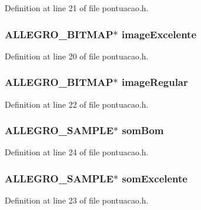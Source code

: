 Definition at line 21 of file pontuacao.\-h.

\hypertarget{struct_ranked_a35a1832af793bed669bf45cb25baa25c}{
\subsubsection[{image\-Excelente}]{\setlength{\rightskip}{0pt plus 5cm}A\-L\-L\-E\-G\-R\-O\-\_\-\-B\-I\-T\-M\-A\-P$\ast$ image\-Excelente}}\label{struct_ranked_a35a1832af793bed669bf45cb25baa25c}


Definition at line 20 of file pontuacao.\-h.

\hypertarget{struct_ranked_a4ccc687d0731c25cac3dd4203ad0d555}{
\subsubsection[{image\-Regular}]{\setlength{\rightskip}{0pt plus 5cm}A\-L\-L\-E\-G\-R\-O\-\_\-\-B\-I\-T\-M\-A\-P$\ast$ image\-Regular}}\label{struct_ranked_a4ccc687d0731c25cac3dd4203ad0d555}


Definition at line 22 of file pontuacao.\-h.

\hypertarget{struct_ranked_aa838844e2fa34dd7aa742a35c08042f6}{
\subsubsection[{som\-Bom}]{\setlength{\rightskip}{0pt plus 5cm}A\-L\-L\-E\-G\-R\-O\-\_\-\-S\-A\-M\-P\-L\-E$\ast$ som\-Bom}}\label{struct_ranked_aa838844e2fa34dd7aa742a35c08042f6}


Definition at line 24 of file pontuacao.\-h.

\hypertarget{struct_ranked_acb25ecfb3cf37f98d8726bfbfca5ff50}{
\subsubsection[{som\-Excelente}]{\setlength{\rightskip}{0pt plus 5cm}A\-L\-L\-E\-G\-R\-O\-\_\-\-S\-A\-M\-P\-L\-E$\ast$ som\-Excelente}}\label{struct_ranked_acb25ecfb3cf37f98d8726bfbfca5ff50}


Definition at line 23 of file pontuacao.\-h.

